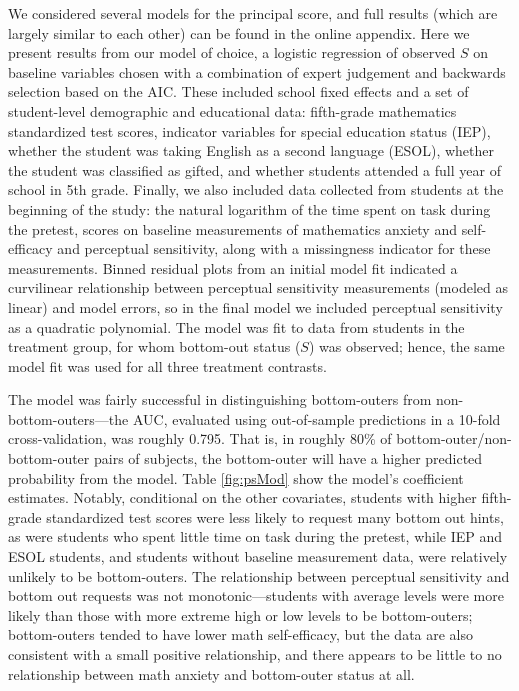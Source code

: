 \documentclass{statsoc} %
\begin{document}
We considered several models for the principal score, and full results (which are largely similar to each other) can be found in the online appendix. Here we present results from our model of choice, a logistic regression of observed $S$ on baseline variables chosen with a combination of expert judgement and backwards selection based on the AIC. These included school fixed effects and a set of student-level demographic and educational data: fifth-grade mathematics standardized test scores, %
indicator variables for special education status (IEP), whether the student was taking English as a second language (ESOL), whether the student was classified as gifted, and whether students attended a full year of school in 5th grade. Finally, we also included data collected from students at the beginning of the study: the natural logarithm of the  time spent on task during the pretest, scores on baseline measurements of mathematics anxiety and self-efficacy and perceptual sensitivity, along with a missingness indicator for these measurements.
Binned residual plots \citep{gelman2006data} from an initial model fit indicated a curvilinear relationship between perceptual sensitivity measurements (modeled as linear) and model errors, so in the final model we included perceptual sensitivity as a quadratic polynomial.
The model was fit to data from students in the treatment group, for whom bottom-out status ($S$) was observed; hence, the same model fit was used for all three treatment contrasts.

The model was fairly successful in distinguishing bottom-outers from non-bottom-outers---the AUC, evaluated using out-of-sample predictions in a 10-fold cross-validation, was roughly 0.795. That is, in roughly 80\% of bottom-outer/non-bottom-outer pairs of subjects, the bottom-outer will have a higher predicted probability from the model.
Table \ref{fig:psMod} show the model's coefficient estimates. Notably, conditional on the other covariates, students with higher fifth-grade standardized test scores were less likely to request many bottom out hints, as were students who spent little time on task during the pretest, while IEP and ESOL students, and students without baseline measurement data, were relatively unlikely to be bottom-outers. The relationship between perceptual sensitivity and bottom out requests was not monotonic---students with average levels were more likely than those with more extreme high or low levels to be bottom-outers; bottom-outers tended to have lower math self-efficacy, but the data are also consistent with a small positive relationship, and there appears to be little to no relationship between math anxiety and bottom-outer status at all.
\end{document}
